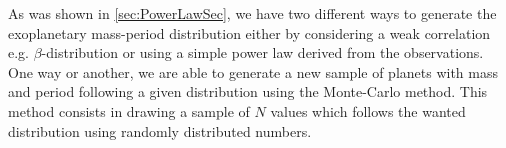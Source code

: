 As was shown in \autoref{sec:PowerLawSec}, we have two different ways to generate the exoplanetary mass-period distribution either by considering a weak correlation e.g. $\beta$-distribution or using a simple power law derived from the observations. One way or another, we are able to generate a new sample of planets with mass and period following a given distribution using the Monte-Carlo method. This method consists in drawing a sample of $N$ values which follows the wanted distribution using randomly distributed numbers.\\





